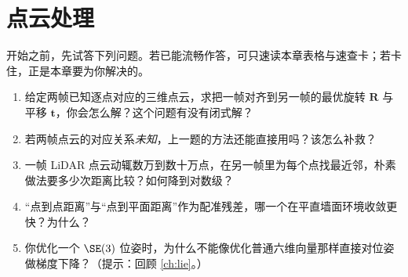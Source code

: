 \chapter{点云处理}
\label{ch:pointcloud}


\begin{practice}[前置自测]
开始之前，先试答下列问题。若已能流畅作答，可只速读本章表格与速查卡；若卡住，正是本章要为你解决的。
\begin{enumerate}
  \item 给定两帧已知逐点对应的三维点云，求把一帧对齐到另一帧的最优旋转 $\mathbf{R}$ 与平移 $\mathbf{t}$，你会怎么解？这个问题有没有闭式解？
  \item 若两帧点云的对应关系\emph{未知}，上一题的方法还能直接用吗？该怎么补救？
  \item 一帧 LiDAR 点云动辄数万到数十万点，在另一帧里为每个点找最近邻，朴素做法要多少次距离比较？如何降到对数级？
  \item “点到点距离”与“点到平面距离”作为配准残差，哪一个在平直墙面环境收敛更快？为什么？
  \item 你优化一个 $\SE(3)$ 位姿时，为什么不能像优化普通六维向量那样直接对位姿做梯度下降？（提示：回顾 \cref{ch:lie}。）
\end{enumerate}
\end{practice}

